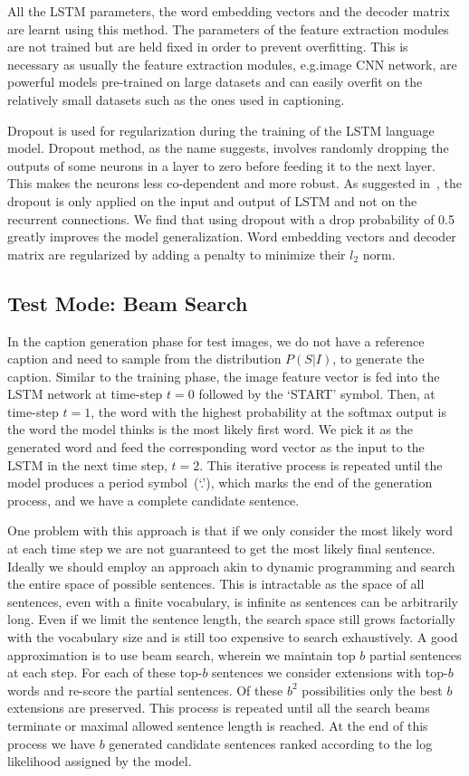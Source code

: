 All the LSTM parameters, the word embedding vectors and the decoder matrix are
learnt using this method.
The parameters of the feature extraction modules are not trained but are held
fixed in order to prevent overfitting.
This is necessary as usually the feature extraction modules, e.g.\@ image CNN
network, are powerful models pre-trained on large datasets and can easily
overfit on the relatively small datasets such as the ones used in captioning.

Dropout is used for regularization during the training of the LSTM language
model.
Dropout method, as the name suggests, involves randomly dropping the outputs
of some neurons in a layer to zero before feeding it to the next layer.
This makes the neurons less co-dependent and more robust.
As suggested in~\cite{ZarembaSV14}, the dropout is only applied on the input and
output of LSTM and not on the recurrent connections.
We find that using dropout with a drop probability of 0.5 greatly improves the
model generalization.
Word embedding vectors and decoder matrix are regularized by adding a penalty to
minimize their $l_2$ norm.

\subsection{Test Mode: Beam Search}
In the caption generation phase for test images, we do not have a reference
caption and need to sample from the distribution $P(S|I)$, to generate the
caption.
Similar to the training phase, the image feature vector is fed into the LSTM
network at time-step $t=0$ followed by the `START' symbol.
Then, at time-step $t=1$, the word with the highest probability at the softmax
output is the word the model thinks is the most likely first word.
We pick it as the generated word and feed the corresponding word vector as the
input to the LSTM in the next time step, $t=2$.
This iterative process is repeated until the model produces a period
symbol~(`.'), which marks the end of the generation process, and we have a
complete candidate sentence.

One problem with this approach is that if we only consider the most likely word
at each time step we are not guaranteed to get the most likely final sentence.
Ideally we should employ an approach akin to dynamic programming and search the
entire space of possible sentences.
This is intractable as the space of all sentences, even with a finite
vocabulary, is infinite as sentences can be arbitrarily long.
Even if we limit the sentence length, the search space still grows factorially
with the vocabulary size and is still too expensive to search exhaustively.
A good approximation is to use beam search, wherein we maintain top $b$ partial
sentences at each step.
For each of these top-$b$ sentences we consider extensions with top-$b$ words
and re-score the partial sentences.
Of these $b^2$ possibilities only the best $b$ extensions are preserved.
This process is repeated until all the search beams terminate or maximal
allowed sentence length is reached.
At the end of this process we have $b$ generated candidate sentences ranked
according to the log likelihood assigned by the model.

